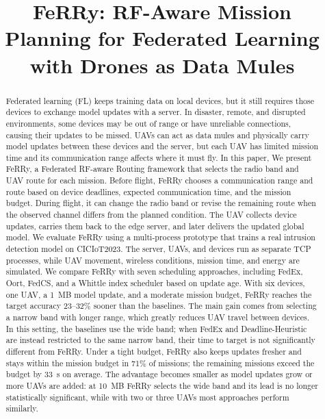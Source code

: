 \documentclass[conference]{IEEEtran}
\newcommand{\sysname}{FeRRy}
\begin{document}
\title{\sysname{}: RF-Aware Mission Planning for Federated Learning with Drones as Data Mules}

\maketitle

\begin{abstract}
Federated learning (FL) keeps training data on local devices, but it still
requires those devices to exchange model updates with a server. In disaster,
remote, and disrupted environments, some devices may be out of range or have
unreliable connections, causing their updates to be missed. UAVs can act as data
mules and physically carry model updates between these devices and the server,
but each UAV has limited mission time and its communication range affects where
it must fly. In this paper, We present \sysname{}, a Federated RF-aware Routing framework that selects the radio
band and UAV route for each mission. Before flight, \sysname{} chooses a communication
range and route based on device deadlines, expected communication time, and the
mission budget. During flight, it can change the radio band or revise the
remaining route when the observed channel differs from the planned condition.
The UAV collects device updates, carries them back to the edge server, and later
delivers the updated global model. We evaluate \sysname{} using a multi-process prototype that trains a real intrusion
detection model on CICIoT2023. The server, UAVs, and devices run as separate TCP
processes, while UAV movement, wireless conditions, mission time, and energy are
simulated. We compare \sysname{} with seven scheduling approaches, including FedEx,
Oort, FedCS, and a Whittle index scheduler based on update age. With six devices,
one UAV, a 1~MB model update, and a moderate mission budget, \sysname{} reaches the
target accuracy 23--32\% sooner than the baselines. The main gain comes from
selecting a narrow band with longer range, which greatly reduces UAV travel
between devices. In this setting, the baselines use the wide band; when FedEx
and Deadline-Heuristic are instead restricted to the same narrow band, their
time to target is not significantly different from \sysname{}. Under a tight budget,
\sysname{} also keeps updates fresher and stays within the mission budget in 71\% of
missions; the remaining missions exceed the budget by 33~s on average. The
advantage becomes smaller as model updates grow or more UAVs are added: at
10~MB \sysname{} selects the wide band and its lead is no longer statistically
significant, while with two or three UAVs most approaches perform similarly.
\end{abstract}
\end{document}
